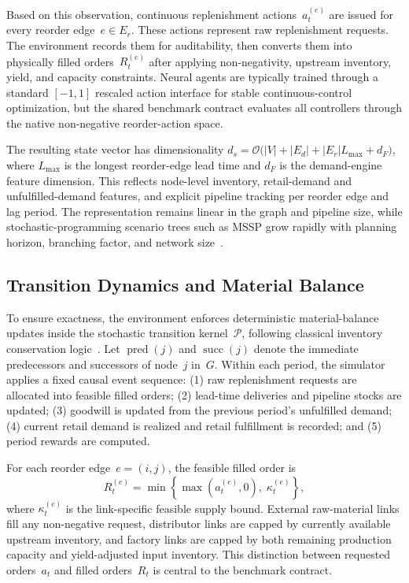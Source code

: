 \documentclass[10pt,a4paper]{article}
\begin{document}
Based on this observation, continuous replenishment actions~$a_t^{(e)}$
are issued for every reorder edge~$e \in E_r$. These actions represent
raw replenishment requests. The environment records them for auditability,
then converts them into physically filled orders~$R_t^{(e)}$ after
applying non-negativity, upstream inventory, yield, and capacity
constraints. Neural agents are typically trained through a standard
$[-1,1]$ rescaled action interface for stable continuous-control
optimization, but the shared benchmark contract evaluates all controllers
through the native non-negative reorder-action space.

The resulting state vector has dimensionality
$d_s = \mathcal{O}\bigl(|V| + |E_d| + |E_r|L_{\max} + d_F\bigr)$,
where $L_{\max}$ is the longest reorder-edge lead time and $d_F$ is the
demand-engine feature dimension. This reflects node-level inventory,
retail-demand and unfulfilled-demand features, and explicit pipeline
tracking per reorder edge and lag period. The representation remains
linear in the graph and pipeline size, while stochastic-programming
scenario trees such as MSSP grow rapidly with planning horizon, branching
factor, and network size~\citep{birge2011}.

\subsection{Transition Dynamics and Material Balance}\label{sec:dynamics}

To ensure exactness, the environment enforces deterministic material-balance
updates inside the stochastic transition kernel~$\mathcal{P}$, following
classical inventory conservation logic~\citep{zipkin2000}. Let
$\operatorname{pred}(j)$ and $\operatorname{succ}(j)$ denote the immediate
predecessors and successors of node~$j$ in~$G$. Within each period, the
simulator applies a fixed causal event sequence: (1) raw replenishment requests
are allocated into feasible filled orders; (2) lead-time deliveries and pipeline
stocks are updated; (3) goodwill is updated from the previous period's
unfulfilled demand; (4) current retail demand is realized and retail fulfillment
is recorded; and (5) period rewards are computed.

For each reorder edge~$e=(i,j)$, the feasible filled order is
\begin{equation}\label{eq:filled_order}
  R_t^{(e)} = \min\left\{\max(a_t^{(e)},0),\; \kappa_t^{(e)}\right\},
\end{equation}
where $\kappa_t^{(e)}$ is the link-specific feasible supply bound. External
raw-material links fill any non-negative request, distributor links are capped
by currently available upstream inventory, and factory links are capped by both
remaining production capacity and yield-adjusted input inventory. This
distinction between requested orders~$a_t$ and filled orders~$R_t$ is central to
the benchmark contract.
\end{document}
